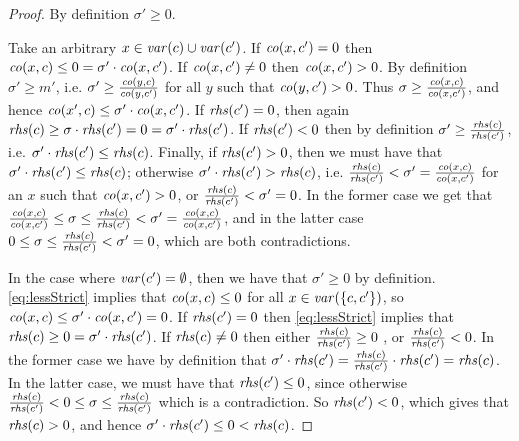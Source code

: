 \begin{proof}
By definition $\sigma'\geq 0$.

Take an arbitrary $x\in\mathit{var}(c)\cup\mathit{var}(c')$. If $\mathit{co}(x,c')=0$ then $\mathit{co}(x,c)\leq 0 = \sigma'\cdot \mathit{co}(x,c')$.
If $\mathit{co}(x,c')\neq 0$ then $\mathit{co}(x,c')>0$. By definition $\sigma'\geq m'$, i.e. $\sigma'\geq \frac{\mathit{co}(y,c)}{\mathit{co}(y,c')}$ for all $y$ such that $\mathit{co}(y,c')>0$. Thus $\sigma\geq \frac{\mathit{co}(x,c)}{\mathit{co}(x,c')}$, and hence $\mathit{co}(x',c) \leq \sigma'\cdot \mathit{co}(x,c')$.
If  $\mathit{rhs}(c')= 0$, then again $\mathit{rhs}(c)\geq \sigma\cdot \mathit{rhs}(c') = 0 = \sigma'\cdot \mathit{rhs}(c')$. If $\mathit{rhs}(c')<0$ then by definition $\sigma'\geq \frac{\mathit{rhs}(c)}{\mathit{rhs}(c')}$, i.e. $\sigma'\cdot \mathit{rhs}(c') \leq \mathit{rhs}(c)$.
Finally, if $\mathit{rhs}(c') > 0$, then we must have that $\sigma'\cdot \mathit{rhs}(c')\leq \mathit{rhs}(c)$; otherwise $\sigma'\cdot \mathit{rhs}(c')>\mathit{rhs}(c)$, i.e. $\frac{\mathit{rhs}(c)}{\mathit{rhs}(c')}<\sigma' = \frac{\mathit{co}(x,c)}{\mathit{co}(x,c')}$ for an $x$ such that $\mathit{co}(x,c')>0$, or $\frac{\mathit{rhs}(c)}{\mathit{rhs}(c')}<\sigma' = 0$. In the former case we get that $\frac{\mathit{co}(x,c)}{\mathit{co}(x,c')}\leq \sigma \leq \frac{\mathit{rhs}(c)}{\mathit{rhs}(c')} < \sigma' = \frac{\mathit{co}(x,c)}{\mathit{co}(x,c')}$, and in the latter case $0\leq \sigma\leq \frac{\mathit{rhs}(c)}{\mathit{rhs}(c')}<\sigma' = 0$, which are both contradictions.

In the case where $\mathit{var}(c')=\emptyset$, then we have that $\sigma'\geq 0$ by definition. \eqref{eq:lessStrict} implies that $\mathit{co}(x,c)\leq 0$ for all $x\in \mathit{var}(\{c,c'\})$, so $\mathit{co}(x,c)\leq \sigma'\cdot\mathit{co}(x,c') = 0$. 
If $\mathit{rhs}(c')=0$ then \eqref{eq:lessStrict} implies that $\mathit{rhs}(c)\geq 0=\sigma'\cdot \mathit{rhs}(c')$. 
If $\mathit{rhs}(c)\neq 0$ then either $\frac{\mathit{rhs}(c)}{\mathit{rhs}(c')}\geq 0$ , or $\frac{\mathit{rhs}(c)}{\mathit{rhs}(c')}<0$. In the former case we have by definition that $\sigma'\cdot \mathit{rhs}(c')=\frac{\mathit{rhs}(c)}{\mathit{rhs}(c')}\cdot \mathit{rhs}(c') = \mathit{rhs}(c)$. In the latter case, we must have that $\mathit{rhs}(c')\leq 0$, since otherwise  $\frac{\mathit{rhs}(c)}{\mathit{rhs}(c')}<0\leq \sigma \leq \frac{\mathit{rhs}(c)}{\mathit{rhs}(c')}$ which is a contradiction. So $\mathit{rhs}(c') <0$, which gives that $\mathit{rhs}(c)>0$, and hence $\sigma'\cdot \mathit{rhs}(c') \leq 0 < \mathit{rhs}(c)$.
\end{proof}	%

